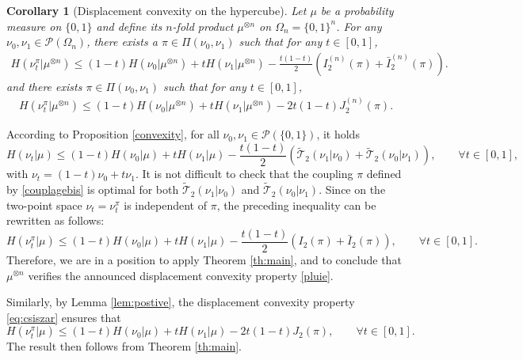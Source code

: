 \documentclass[11pt]{amsart}
\newtheorem{cor}[equation]{Corollary}
\numberwithin{equation}{section}
\begin{document}
\begin{cor}[Displacement convexity on the hypercube] \label{cor:dchypercube}
Let $\mu$ be a probability measure on $\{0,1\}$ and define its $n$-fold product $\mu^{\otimes n}$ on $\Omega_n = \{0,1\}^n$.
For any $\nu_0, \nu_1 \in \mathcal{P}(\Omega_n)$, there exists a $\pi \in \Pi(\nu_{0},\nu_{1})$ such that for any $t \in [0,1]$, 
\begin{align} \label{pluie}
H(\nu_t^{\pi}|\mu^{\otimes n}) \leq 
(1-t)H(\nu_0|\mu^{\otimes n})+tH(\nu_1|\mu^{\otimes n}) 
-\frac{t(1-t)}{2}\left(I_2^{(n)}(\pi)+ \bar{I}_{2}^{(n)}(\pi) \right).
\end{align} 
and there exists $\pi \in \Pi(\nu_{0},\nu_{1})$ such that for any $t \in [0,1]$, 
\begin{align} \label{pluies}
H(\nu_t^{\pi}|\mu^{\otimes n}) \leq 
(1-t)H(\nu_0|\mu^{\otimes n})+tH(\nu_1|\mu^{\otimes n}) 
-{2t(1-t)}J_2^{(n)}(\pi).
\end{align} 

\end{cor}
\proof
According to Proposition \ref{convexity}, for all $\nu_0,\nu_1 \in \mathcal{P}(\{0,1\})$, it holds
$$H(\nu_t|\mu) \leq 
(1-t)H(\nu_0|\mu)+tH(\nu_1|\mu) 
-\frac{t(1-t)}{2}\left({\widetilde{\mathcal{T}}}_{2}(\nu_1|\nu_0)+{\widetilde{\mathcal{T}}}_{2}(\nu_0|\nu_1) \right),\qquad \forall t\in [0,1],$$
with $\nu_t =(1-t)\nu_0 + t\nu_1.$ It is not difficult to check that the coupling $\pi$ defined by \eqref{couplagebis} is optimal for both ${\widetilde{\mathcal{T}}}_{2}(\nu_1|\nu_0)$ and ${\widetilde{\mathcal{T}}}_{2}(\nu_0|\nu_1)$. Since on the two-point space $\nu_t=\nu_t^\pi$ is independent of $\pi$, the preceding inequality can be rewritten as follows:
$$H(\nu_t^\pi|\mu) \leq 
(1-t)H(\nu_0|\mu)+tH(\nu_1|\mu) 
-\frac{t(1-t)}{2}\left(I_2(\pi)+\bar{I}_2(\pi) \right),\qquad \forall t\in [0,1].$$
Therefore, we are in a position to apply Theorem \ref{th:main}, and to conclude that $\mu^{\otimes n}$ verifies the announced displacement convexity property \eqref{pluie}.

Similarly, by Lemma \ref{lem:postive}, the displacement convexity property \eqref{eq:csiszar} ensures that 
$$H(\nu_t^\pi|\mu) \leq 
(1-t)H(\nu_0|\mu)+tH(\nu_1|\mu) 
-{2t(1-t)}J_2(\pi),\qquad \forall t\in [0,1].$$
The result then follows from Theorem \ref{th:main}.
\endproof
\end{document}
